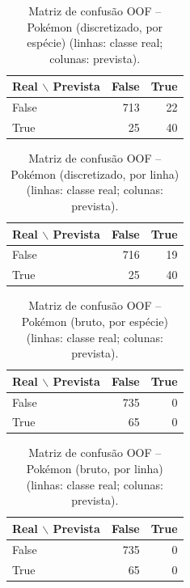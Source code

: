 \documentclass[a4paper,11pt]{article}
\begin{document}
\begin{table}[htbp]
\centering
\small
\caption{Matriz de confusão OOF -- Pokémon (discretizado, por espécie) (linhas: classe real; colunas: prevista).}
\label{tab:conf_pokemon_disc_group}
\begin{tabular}{lrr}
\toprule
Real $\backslash$ Prevista & False & True \\
\midrule
False & 713 & 22 \\
True & 25 & 40 \\
\bottomrule
\end{tabular}
\end{table}

\begin{table}[htbp]
\centering
\small
\caption{Matriz de confusão OOF -- Pokémon (discretizado, por linha) (linhas: classe real; colunas: prevista).}
\label{tab:conf_pokemon_disc_row}
\begin{tabular}{lrr}
\toprule
Real $\backslash$ Prevista & False & True \\
\midrule
False & 716 & 19 \\
True & 25 & 40 \\
\bottomrule
\end{tabular}
\end{table}

\begin{table}[htbp]
\centering
\small
\caption{Matriz de confusão OOF -- Pokémon (bruto, por espécie) (linhas: classe real; colunas: prevista).}
\label{tab:conf_pokemon_raw_group}
\begin{tabular}{lrr}
\toprule
Real $\backslash$ Prevista & False & True \\
\midrule
False & 735 & 0 \\
True & 65 & 0 \\
\bottomrule
\end{tabular}
\end{table}

\begin{table}[htbp]
\centering
\small
\caption{Matriz de confusão OOF -- Pokémon (bruto, por linha) (linhas: classe real; colunas: prevista).}
\label{tab:conf_pokemon_raw_row}
\begin{tabular}{lrr}
\toprule
Real $\backslash$ Prevista & False & True \\
\midrule
False & 735 & 0 \\
True & 65 & 0 \\
\bottomrule
\end{tabular}
\end{table}
\end{document}
